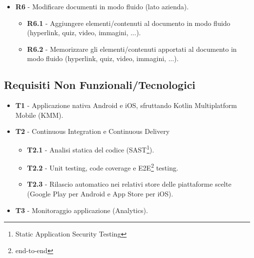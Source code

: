 \begin{itemize}
    \item \textbf{R6} - Modificare documenti in modo fluido (lato azienda).
    \begin{itemize}
        \item \textbf{R6.1} - Aggiungere elementi/contenuti al documento in modo fluido (hyperlink, quiz, video, immagini, ...). %
        \item \textbf{R6.2} - Memorizzare gli elementi/contenuti apportati al documento in modo fluido (hyperlink, quiz, video, immagini, ...).
    \end{itemize}
\end{itemize}

\subsection{Requisiti Non Funzionali/Tecnologici}
\begin{itemize}
    \item \textbf{T1} - Applicazione nativa Android e iOS, sfruttando Kotlin Multiplatform Mobile (KMM).
    \item \textbf{T2} - Continuous Integration e Continuous Delivery
    \begin{itemize}
        \item \textbf{T2.1} - Analisi statica del codice (SAST\footnote{Static Application Security Testing}).
        \item \textbf{T2.2} - Unit testing, code coverage e E2E\footnote{end-to-end} testing.
        \item \textbf{T2.3} - Rilascio automatico nei relativi store delle piattaforme scelte (Google Play per Android e App Store per iOS).
    \end{itemize}
    \item \textbf{T3} - Monitoraggio applicazione (Analytics).
\end{itemize}

